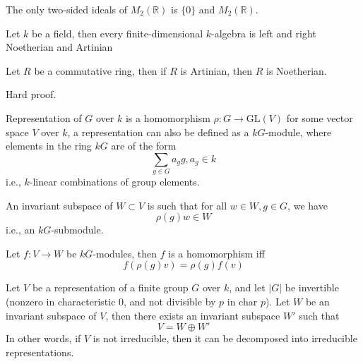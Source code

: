 \documentclass[openany]{book}
\newcommand{\R}{\mathbb{R}}
\newcommand{\gl}{\text{GL}}
\begin{document}
\begin{prop}
    The only two-sided ideals of $M_2(\R)$ is $\{0\}$ and $M_2(\R)$.
\end{prop}


\begin{prop}
    Let $k$ be a field, then every finite-dimensional $k$-algebra is left and right Noetherian and Artinian
\end{prop}

\begin{prop}
    Let $R$ be a commutative ring, then if $R$ is Artinian, then $R$ is Noetherian.
\end{prop}
Hard proof.



\begin{defn}[representation]
    Representation of $G$ over $k$ is a homomorphism $\rho:G\to\gl(V)$ for some vector space $V$ over $k$, a representation can also be defined as a $kG$-module, where elements in the ring $kG$ are of the form 
    \begin{equation*}
        \sum_{g\in G}a_gg, a_g\in k
    \end{equation*}
    i.e., $k$-linear combinations of group elements.

    An invariant subspace of $W\subset V$ is such that for all $w\in W, g\in G$, we have 
    \begin{equation*}
        \rho(g)w\in W
    \end{equation*}
    i.e., an $kG$-submodule.
\end{defn}

\begin{defn}
    Let $f:V\to W$ be $kG$-modules, then $f$ is a homomorphism iff 
    \begin{equation*}
        f(\rho(g)v)=\rho(g)f(v)
    \end{equation*}
\end{defn}

\begin{prop}
    Let $V$ be a representation of a finite group $G$ over $k$, and let $|G|$ be invertible (nonzero in characteristic $0$, and not divisible by $p$ in char $p$). Let $W$ be an invariant subspace of $V$, then there exists an invariant subspace $W'$ such that 
    \begin{equation*}
        V=W\oplus W'
    \end{equation*}
    In other words, if $V$ is not irreducible, then it can be decomposed into irreducible representations.
\end{prop}
\end{document}
